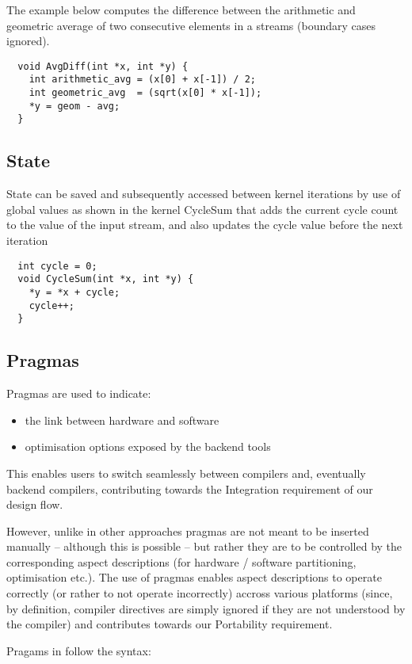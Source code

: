 The example below computes the difference between the arithmetic and
geometric average of two consecutive elements in a streams (boundary
cases ignored).


\begin{lstlisting}
  void AvgDiff(int *x, int *y) {
    int arithmetic_avg = (x[0] + x[-1]) / 2;
    int geometric_avg  = (sqrt(x[0] * x[-1]);
    *y = geom - avg;
  }
\end{lstlisting}

\subsection{State}
State can be saved and subsequently accessed between kernel iterations
by use of global values as shown in the kernel CycleSum that adds the
current cycle count to the value of the input stream, and also updates
the cycle value before the next iteration
\begin{lstlisting}
  int cycle = 0;
  void CycleSum(int *x, int *y) {
    *y = *x + cycle;
    cycle++;
  }
\end{lstlisting}

\subsection{Pragmas}

Pragmas are used to indicate:
\begin{itemize}
\item the link between hardware and software
\item optimisation options exposed by the backend tools
\end{itemize}

This enables users to switch seamlessly between compilers and,
eventually backend compilers, contributing towards the Integration
requirement of our design flow.

However, unlike in other approaches pragmas are not
meant to be inserted manually -- although this is possible -- but
rather they are to be controlled by the corresponding aspect
descriptions (for hardware / software partitioning, optimisation
etc.). The use of pragmas enables aspect descriptions to operate
correctly (or rather to not operate incorrectly) accross various
platforms (since, by definition, compiler directives are simply
ignored if they are not understood by the compiler) and contributes
towards our Portability requirement.

Pragams in \FAST{} follow the syntax:

